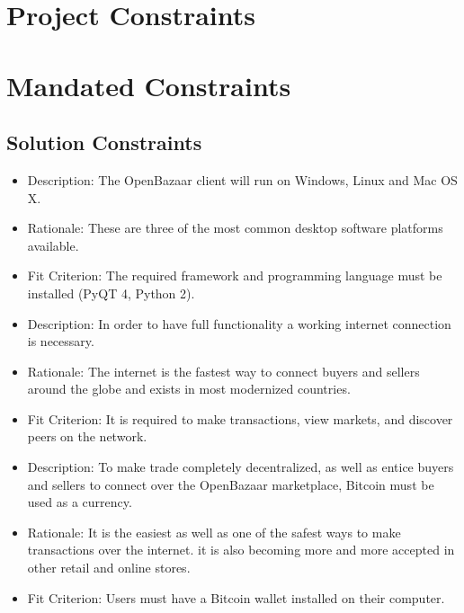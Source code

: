 \documentclass{article}
\begin{document}
\section*{Project Constraints}

\section{Mandated Constraints}

\subsection{Solution Constraints}
\begin{itemize}

\item
Description: The OpenBazaar client will run on Windows, Linux and Mac OS X. 

\item
Rationale: These are three of the most common desktop software platforms available. 

\item
Fit Criterion: The required framework and programming language must be installed (PyQT 4, Python 2).

\item
Description: In order to have full functionality a working internet connection is necessary.

\item
Rationale: The internet is the fastest way to connect buyers and sellers around the globe and exists in most modernized countries.

\item
Fit Criterion: It is required to make transactions, view markets, and discover peers on the network.

\item
Description: To make trade completely decentralized, as well as entice buyers and sellers to connect over the OpenBazaar marketplace, Bitcoin must be used as a currency. 

\item
Rationale: It is the easiest as well as one of the safest ways to make transactions over the internet. it is also becoming more and more accepted in other retail and online stores. 

\item
Fit Criterion: Users must have a Bitcoin wallet installed on their computer. 

\end{itemize}
\end{document}

